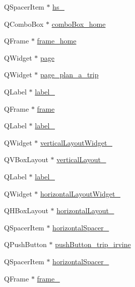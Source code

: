 \begin{DoxyCompactItemize}
\item 
Q\+Spacer\+Item $\ast$ \hyperlink{class_ui___main_window_ae0232a323bce664cae0d1868ffcec1b6}{hs\+\_}
\item 
Q\+Combo\+Box $\ast$ \hyperlink{class_ui___main_window_ab8aef0dfd08c9aa9ba6a0dd0ceb742d9}{combo\+Box\+\_\+home}
\item 
Q\+Frame $\ast$ \hyperlink{class_ui___main_window_ad12afba098b0c2f6b89cc30cb8c7e057}{frame\+\_\+home}
\item 
Q\+Widget $\ast$ \hyperlink{class_ui___main_window_ad7d164376bef8649ee1f94697b859417}{page}
\item 
Q\+Widget $\ast$ \hyperlink{class_ui___main_window_a16a9a2ce97a3666a489789d1097dce9a}{page\+\_\+plan\+\_\+a\+\_\+trip}
\item 
Q\+Label $\ast$ \hyperlink{class_ui___main_window_a13936e6f18b1c90402b3c7a3c92b6cdb}{label\+\_}
\item 
Q\+Frame $\ast$ \hyperlink{class_ui___main_window_ad01968740c435709a8b2ec4c08094c67}{frame}
\item 
Q\+Label $\ast$ \hyperlink{class_ui___main_window_a0376fd90247280e7c7957cc70628708c}{label\+\_}
\item 
Q\+Widget $\ast$ \hyperlink{class_ui___main_window_af6749af8ef02fe4d93e808cd1fd8c9c5}{vertical\+Layout\+Widget\+\_}
\item 
Q\+V\+Box\+Layout $\ast$ \hyperlink{class_ui___main_window_a38b8a4b887f3b58e2a49e7905ae6f1f0}{vertical\+Layout\+\_}
\item 
Q\+Label $\ast$ \hyperlink{class_ui___main_window_ac1cbc41e9dbaeb3d0bdc2189d8e9ee1d}{label\+\_}
\item 
Q\+Widget $\ast$ \hyperlink{class_ui___main_window_a501fab413d3b301dcdafacd5729f0f02}{horizontal\+Layout\+Widget\+\_}
\item 
Q\+H\+Box\+Layout $\ast$ \hyperlink{class_ui___main_window_a14c9d4842c3e97e16e7873ef0aecdb1e}{horizontal\+Layout\+\_}
\item 
Q\+Spacer\+Item $\ast$ \hyperlink{class_ui___main_window_a71605bcf74c938f64207451850fc69b1}{horizontal\+Spacer\+\_}
\item 
Q\+Push\+Button $\ast$ \hyperlink{class_ui___main_window_a23c1929e1e92e76df7ad0e7c2de6a9c1}{push\+Button\+\_\+trip\+\_\+irvine}
\item 
Q\+Spacer\+Item $\ast$ \hyperlink{class_ui___main_window_a3202b80ffde7629da626c1e0994f63f5}{horizontal\+Spacer\+\_}
\item 
Q\+Frame $\ast$ \hyperlink{class_ui___main_window_ab47865bd12cd980e143b3fc06ad24ac1}{frame\+\_}

\end{DoxyCompactItemize}
